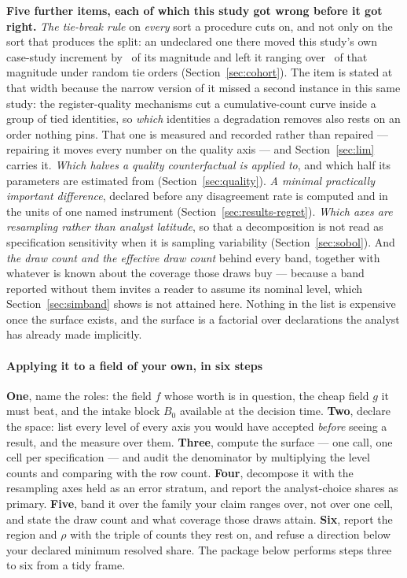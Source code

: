 \textbf{Five further items, each of which this study got wrong before it got
right.} \emph{The tie-break rule} on \emph{every} sort a procedure cuts on,
and not only on the sort that produces the split: an undeclared one there
moved this study's own case-study increment by
\tiebreakShiftPct\ of its magnitude and left it ranging over
\tiebreakRangeSharePct\ of that magnitude under random tie orders
(Section~\ref{sec:cohort}). The item is stated at that width because the
narrow version of it missed a second instance in this same study: the
register-quality mechanisms cut a cumulative-count curve inside a group of
tied identities, so \emph{which} identities a degradation removes also rests
on an order nothing pins. That one is measured and recorded rather than
repaired --- repairing it moves every number on the quality axis --- and
Section~\ref{sec:lim} carries it. \emph{Which halves a quality
counterfactual is applied to}, and which half its parameters are estimated
from (Section~\ref{sec:quality}). \emph{A minimal practically important
difference}, declared before any disagreement rate is computed and in the
units of one named instrument (Section~\ref{sec:results-regret}).
\emph{Which axes are resampling rather than analyst latitude}, so that a
decomposition is not read as specification sensitivity when it is sampling
variability (Section~\ref{sec:sobol}). And \emph{the draw count and the
\emph{effective} draw count} behind every band, together with whatever is
known about the coverage those draws buy --- because a band reported without
them invites a reader to assume its nominal level, which
Section~\ref{sec:simband} shows is not attained here. Nothing in the list is
expensive once the surface exists, and the surface is a factorial over
declarations the analyst has already made implicitly.

\paragraph{Applying it to a field of your own, in six steps}
\textbf{One}, name the roles: the field $f$ whose worth is in question, the
cheap field $g$ it must beat, and the intake block $B_0$ available at the
decision time. \textbf{Two}, declare the space: list every level of every
axis you would have accepted \emph{before} seeing a result, and the measure
over them. \textbf{Three}, compute the surface --- one call, one cell per
specification --- and audit the denominator by multiplying the level counts
and comparing with the row count. \textbf{Four}, decompose it with the
resampling axes held as an error stratum, and report the analyst-choice shares
as primary. \textbf{Five}, band it over the family your claim ranges over,
not over one cell, and state the draw count and what coverage those draws
attain. \textbf{Six}, report the region and $\rho$ with the triple of counts
they rest on, and refuse a direction below your declared minimum resolved
share. The package below performs steps three to six from a tidy frame.

